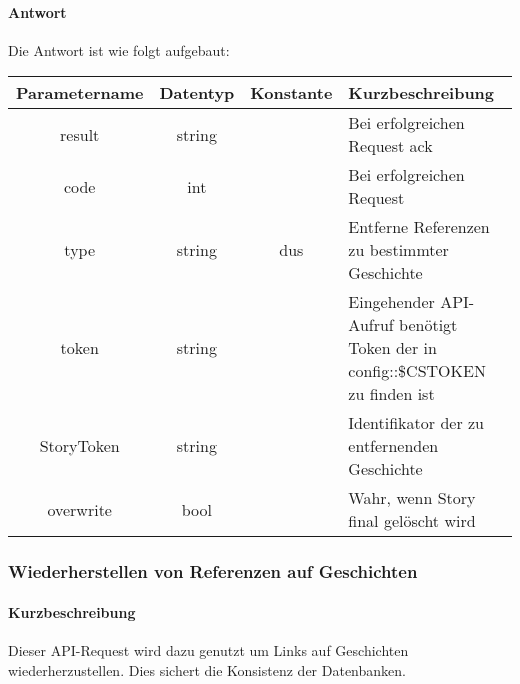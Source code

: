 \paragraph{Antwort}Die Antwort ist wie folgt aufgebaut:
\begin{table}[H]
	\begin{tabular}{|c|c|c|p{6.5cm}|}
		\hline
		\textbf{Parametername} & \textbf{Datentyp} & \textbf{Konstante} & \textbf{Kurzbeschreibung}                                                                                               \\ \hline
		result              & string            &                    & Bei erfolgreichen Request {\glqq ack\grqq}                                                                            \\ \hline
		code                & int               &                    & Bei erfolgreichen Request {\glqq 0\grqq} \\ \hline
		type                & string            & dus                & Entferne Referenzen zu bestimmter Geschichte \\ \hline
		token               & string            &                    & Eingehender API-Aufruf benötigt Token der in config::\$CSTOKEN zu finden ist \\ \hline
		StoryToken          & string            &                    & Identifikator der zu entfernenden Geschichte \\ \hline       
		overwrite           & bool              &                    & Wahr, wenn Story final gelöscht wird \\ \hline
	\end{tabular}
\end{table}
\subsubsection{Wiederherstellen von Referenzen auf Geschichten}
\paragraph{Kurzbeschreibung}Dieser API-Request wird dazu genutzt um Links auf Geschichten wiederherzustellen. Dies sichert die Konsistenz der Datenbanken.
